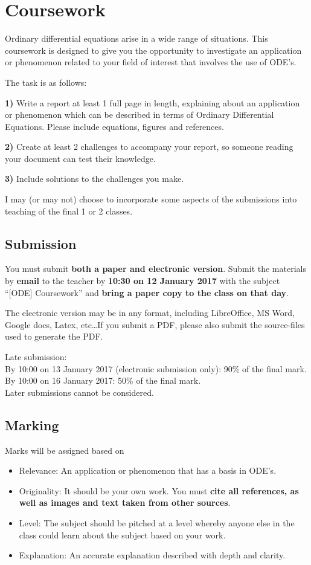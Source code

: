 \newpage
\section{Coursework}
Ordinary differential equations arise in a wide range of situations. This coursework is designed to give you the opportunity to investigate an application or phenomenon related to your field of interest that involves the use of ODE's.

The task is as follows:

\textbf{1)} Write a report at least 1 full page in length, explaining about an application or phenomenon which can be described in terms of Ordinary Differential Equations. Please include equations, figures and references.

\textbf{2)} Create at least 2 challenges to accompany your report, so someone reading your document can test their knowledge.

\textbf{3)} Include solutions to the challenges you make.

I may (or may not) choose to incorporate some aspects of the submissions into teaching of the final 1 or 2 classes.

\subsection{Submission}
You must submit \textbf{both a paper and electronic version}. Submit the materials by \textbf{email} to the teacher by \textbf{10:30 on 12 January 2017} with the subject ``[ODE] Coursework'' and \textbf{bring a paper copy to the class on that day}.

The electronic version may be in any format, including LibreOffice, MS Word, Google docs, Latex, etc\ldots If you submit a PDF, please also submit the source-files used to generate the PDF.

Late submission:\\
By 10:00 on 13 January 2017 (electronic submission only): 90\% of the final mark.\\
By 10:00 on 16 January 2017: 50\% of the final mark.\\
Later submissions cannot be considered.

\subsection{Marking}
Marks will be assigned based on
\begin{itemize}
    \item Relevance: An application or phenomenon that has a basis in ODE's.
    \item Originality: It should be your own work. You must \textbf{cite all references, as well as images and text taken from other sources}.
    \item Level: The subject should be pitched at a level whereby anyone else in the class could learn about the subject based on your work.
    \item Explanation: An accurate explanation described with depth and clarity.
\end{itemize}

